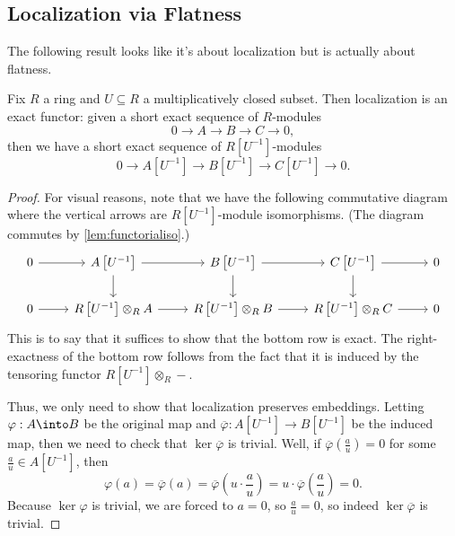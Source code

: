 \subsection{Localization via Flatness}
The following result looks like it's about localization but is actually about flatness.
\begin{proposition} \label{prop:localexact}
	Fix $R$ a ring and $U\subseteq R$ a multiplicatively closed subset. Then localization is an exact functor: given a short exact sequence of $R$-modules
	\[0\to A\to B\to C\to 0,\]
	then we have a short exact sequence of $R\left[U^{-1}\right]$-modules
	\[0\to A\left[U^{-1}\right]\to B\left[U^{-1}\right]\to C\left[U^{-1}\right]\to 0.\]
\end{proposition}
\begin{proof}
	For visual reasons, note that we have the following commutative diagram where the vertical arrows are $R\left[U^{-1}\right]$-module isomorphisms. (The diagram commutes by \autoref{lem:functorialiso}.)
	\[\begin{tikzcd}
		0 & {A\left[U^{-1}\right]} & {B\left[U^{-1}\right]} & {C\left[U^{-1}\right]} & 0 \\
		0 & {R\left[U^{-1}\right]\otimes_RA} & {R\left[U^{-1}\right]\otimes_RB} & {R\left[U^{-1}\right]\otimes_RC} & 0
		\arrow[from=2-2, to=2-3]
		\arrow[from=1-1, to=1-2]
		\arrow[from=2-1, to=2-2]
		\arrow[from=1-2, to=2-2]
		\arrow[from=1-2, to=1-3]
		\arrow[from=1-3, to=2-3]
		\arrow[from=1-3, to=1-4]
		\arrow[from=1-4, to=2-4]
		\arrow[from=1-4, to=1-5]
		\arrow[from=2-3, to=2-4]
		\arrow[from=2-4, to=2-5]
	\end{tikzcd}\]
	This is to say that it suffices to show that the bottom row is exact. The right-exactness of the bottom row follows from the fact that it is induced by the tensoring functor $R\left[U^{-1}\right]\otimes_R-$.

	Thus, we only need to show that localization preserves embeddings. Letting $\varphi:A\into B$ be the original map and $\overline\varphi:A\left[U^{-1}\right]\to B\left[U^{-1}\right]$ be the induced map, then we need to check that $\ker\overline\varphi$ is trivial. Well, if $\overline\varphi\left(\frac au\right)=0$ for some $\frac au\in A\left[U^{-1}\right]$, then
	\[\varphi(a)=\overline\varphi(a)=\overline\varphi\left(u\cdot\frac au\right)=u\cdot\overline\varphi\left(\frac au\right)=0.\]
	Because $\ker\varphi$ is trivial, we are forced to $a=0$, so $\frac au=0$, so indeed $\ker\overline\varphi$ is trivial.
\end{proof}
